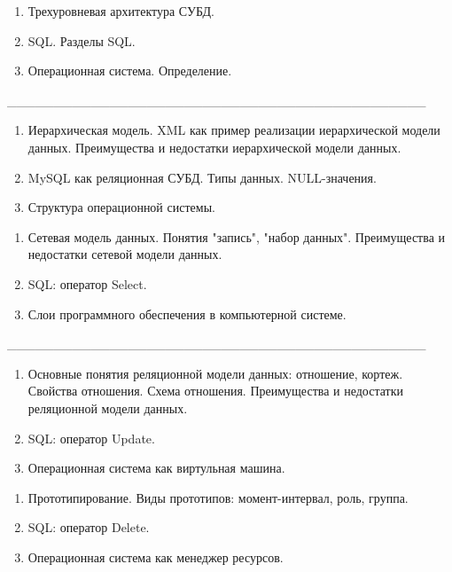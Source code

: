 \documentclass[oneside, final, 14pt]{extreport}
\newcommand{\cutline}{\_\_\_\_\_\_\_\_\_\_\_\_\_\_\_\_\_\_\_\_\_\_\_\_\_\_\_\_\_\_\_\_\_\_\_\_\_\_\_\_\_\_\_\_\_}
\begin{document}

\begin{enumerate}
\item Трехуровневая архитектура СУБД.
\item SQL. Разделы SQL.
\item Операционная система. Определение.
\end{enumerate}


\cutline


\begin{enumerate}
\item Иерархическая модель. XML как пример реализации иерархической модели данных. Преимущества и недостатки иерархической модели данных.
\item MySQL как реляционная СУБД. Типы данных. NULL-значения.
\item Структура операционной системы.
\end{enumerate}


\newpage


\begin{enumerate}
\item Сетевая модель данных. Понятия "запись", "набор данных". Преимущества и недостатки сетевой модели данных.
\item SQL: оператор Select.
\item Слои программного обеспечения в компьютерной системе.
\end{enumerate}


\cutline


\begin{enumerate}
\item Основные понятия реляционной модели данных: отношение, кортеж.
Свойства отношения. Схема отношения. Преимущества и недостатки реляционной модели данных.
\item SQL: оператор Update.
\item Операционная система как виртульная машина.
\end{enumerate}


\newpage


\begin{enumerate}
\item Прототипирование. Виды прототипов: момент-интервал, роль, группа.
\item SQL: оператор Delete.
\item Операционная система как менеджер ресурсов.
\end{enumerate}

\end{document}
